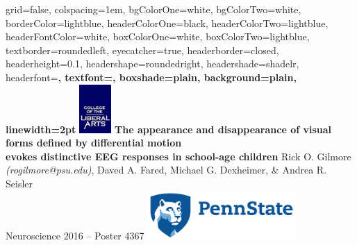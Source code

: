\documentclass[landscape,final,paperwidth=72in,paperheight=42in,fontscale=0.285]{baposter}
\begin{document}


\begin{poster}%
  {
  grid=false,
  colspacing=1em,
  bgColorOne=white,
  bgColorTwo=white,
  borderColor=lightblue,
  headerColorOne=black,
  headerColorTwo=lightblue,
  headerFontColor=white,
  boxColorOne=white,
  boxColorTwo=lightblue,
  textborder=roundedleft,
  eyecatcher=true,
  headerborder=closed,
  headerheight=0.1\textheight,
  headershape=roundedright,
  headershade=shadelr,
  headerfont=\Large\bf\textsc, %
  textfont={\setlength{\parindent}{1.5em}},
  boxshade=plain,
  background=plain,
  linewidth=2pt
  }
  {\includegraphics[height=5em]{img/clalogo.jpg}}
  {\bf{The appearance and disappearance of visual forms defined by differential motion \\evokes distinctive EEG responses in school-age children}\vspace{0.2em}}
  {Rick O. Gilmore \emph{(rogilmore@psu.edu)}, Daved A. Fared, Michael G. Dexheimer, \& Andrea R. Seisler\\ \vspace{0.2em}
  Neuroscience 2016 -- Poster 4367}
  {\includegraphics[height=5em]{img/psu-logo-new-1000-326.jpg}}



\end{poster}
\end{document}
